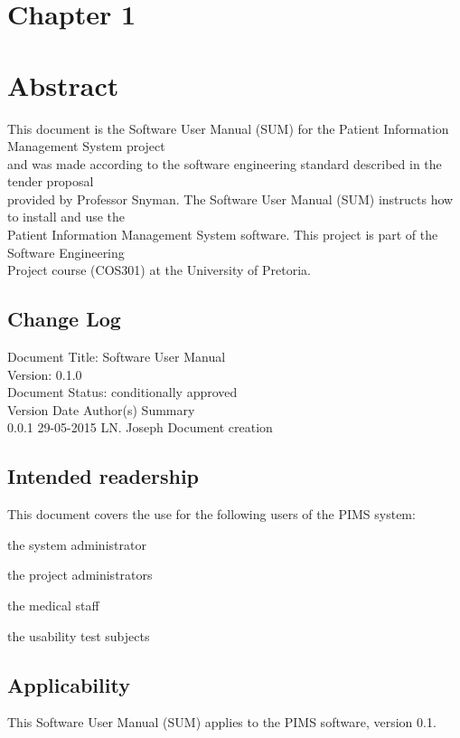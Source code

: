 \documentclass[a4paper,12pt]{report}
\author{Pentec}
\begin{document}
\begin{titlepage}


\section{Chapter 1}


\section{Abstract}
This document is the Software User Manual (SUM) for the Patient Information Management System project\\ and was made according to the software engineering standard described in the tender proposal\\ provided by Professor Snyman. The Software User Manual (SUM) instructs how to install and use the\\
Patient Information Management System software. This project is part of the Software Engineering\\ Project course (COS301) at the University of Pretoria.  \\

\subsection{Change Log}
Document Title: Software User Manual\\
Version: 0.1.0\\
Document Status: conditionally approved\\
Version Date Author(s) Summary\\
0.0.1 29-05-2015 LN. Joseph Document creation\\


\subsection{Intended readership}
This document covers the use for the following users of the PIMS system:\\
\begin{description}
\item the system administrator
\item the project administrators
\item the medical staff
\item the usability test subjects
\end{description}

\subsection{Applicability}
This Software User Manual (SUM) applies to the PIMS software, version 0.1.\\



\end{titlepage}
\end{document}
